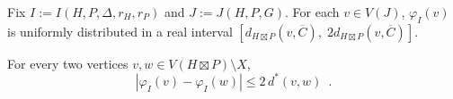 \documentclass{patmorin}
\renewcommand{\ge}{\geqslant}
\renewcommand{\le}{\leqslant}
\begin{document}


\begin{obs}\label{uniform}
  Fix $I:=I(H,P,\Delta,r_H,r_P)$ and $J:=J(H,P,G)$.  For each $v\in V(J)$,
  $\varphi_I(v)$ is uniformly distributed in a real interval $[d_{H\boxtimes P}(v,\overline{C}),\;2d_{H\boxtimes P}(v,\overline{C})]$.
\end{obs}




\begin{lem}\label{double_distance}
  For every two vertices $v,w\in V(H\boxtimes P)\setminus X$,
  \[
    |\varphi_I(v)-\varphi_I(w)| \le 2\, d^*(v,w) \enspace .
  \]
\end{lem}
\end{document}
